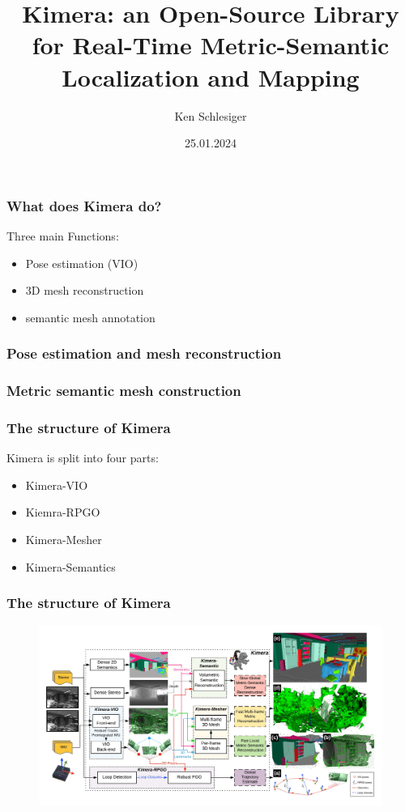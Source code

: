 \documentclass[11pt]{beamer}
\title{Kimera: an Open-Source Library for Real-Time
Metric-Semantic Localization and Mapping}
\author{Ken Schlesiger}
\institute{Universität Würzburg}
\date{25.01.2024}
\begin{document}

\frame[plain]{\titlepage}

\begin{frame}
\frametitle{What does Kimera do?}
Three main Functions: 
\begin{itemize}
    \item Pose estimation (VIO) 
    \item 3D mesh reconstruction
    \item semantic mesh annotation
\end{itemize}
\end{frame}
\begin{frame}
    \frametitle{Pose estimation and mesh reconstruction} 
    \begin{figure}[ht]
        \centering
    \end{figure}
\end{frame}
\begin{frame}
\frametitle{Metric semantic mesh construction}
    \begin{figure}[ht]
        \centering
    \end{figure}
\end{frame}
\begin{frame}
\frametitle{The structure of Kimera}
Kimera is split into four parts:
\begin{itemize}
    \item Kimera-VIO
    \item Kiemra-RPGO
    \item Kimera-Mesher
    \item Kimera-Semantics
\end{itemize}
\end{frame}
\begin{frame}
\frametitle{The structure of Kimera}
\begin{figure}
    \includegraphics[width=\linewidth]{kimera_chart_23.jpeg} 
\end{figure}
\end{frame}
\end{document}
